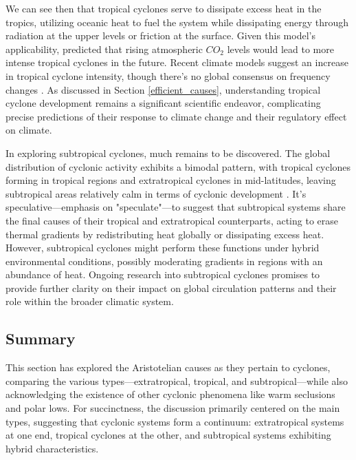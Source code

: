 We can see then that tropical cyclones serve to dissipate excess heat in the tropics, utilizing oceanic heat to fuel the system while dissipating energy through radiation at the upper levels or friction at the surface. Given this model's applicability, \citet{emanuel1987dependence} predicted that rising atmospheric $CO_2$ levels would lead to more intense tropical cyclones in the future. Recent climate models suggest an increase in tropical cyclone intensity, though there's no global consensus on frequency changes \citep{knutson2010tropical,walsh2004tropical,walsh2016tropical,walsh2019tropical}. As discussed in Section \ref{efficient_causes}, understanding tropical cyclone development remains a significant scientific endeavor, complicating precise predictions of their response to climate change and their regulatory effect on climate.

In exploring subtropical cyclones, much remains to be discovered. The global distribution of cyclonic activity exhibits a bimodal pattern, with tropical cyclones forming in tropical regions and extratropical cyclones in mid-latitudes, leaving subtropical areas relatively calm in terms of cyclonic development \citep{yanase2014parameter}. It's speculative—emphasis on "speculate"—to suggest that subtropical systems share the final causes of their tropical and extratropical counterparts, acting to erase thermal gradients by redistributing heat globally or dissipating excess heat. However, subtropical cyclones might perform these functions under hybrid environmental conditions, possibly moderating gradients in regions with an abundance of heat. Ongoing research into subtropical cyclones promises to provide further clarity on their impact on global circulation patterns and their role within the broader climatic system.

\subsection{Summary}

This section has explored the Aristotelian causes as they pertain to cyclones, comparing the various types—extratropical, tropical, and subtropical—while also acknowledging the existence of other cyclonic phenomena like warm seclusions and polar lows. For succinctness, the discussion primarily centered on the main types, suggesting that cyclonic systems form a continuum: extratropical systems at one end, tropical cyclones at the other, and subtropical systems exhibiting hybrid characteristics.

